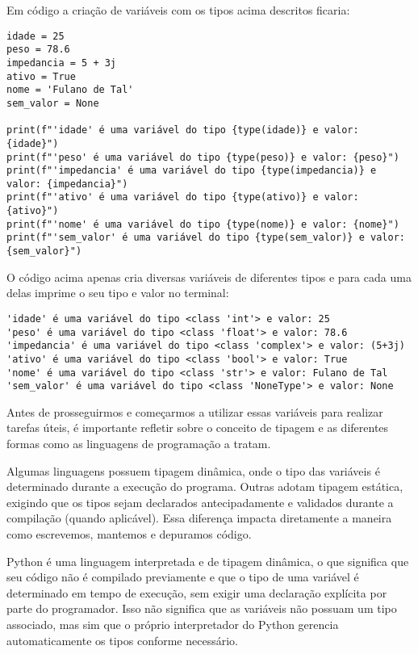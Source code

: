Em código a criação de variáveis com os tipos acima descritos ficaria:
\begin{verbatim}
idade = 25
peso = 78.6
impedancia = 5 + 3j
ativo = True
nome = 'Fulano de Tal'
sem_valor = None

print(f"'idade' é uma variável do tipo {type(idade)} e valor: {idade}")
print(f"'peso' é uma variável do tipo {type(peso)} e valor: {peso}")
print(f"'impedancia' é uma variável do tipo {type(impedancia)} e valor: {impedancia}")
print(f"'ativo' é uma variável do tipo {type(ativo)} e valor: {ativo}")
print(f"'nome' é uma variável do tipo {type(nome)} e valor: {nome}")
print(f"'sem_valor' é uma variável do tipo {type(sem_valor)} e valor: {sem_valor}")
\end{verbatim}

O código acima apenas cria diversas variáveis de diferentes tipos e para cada uma delas imprime o seu tipo e valor no terminal:
\begin{verbatim}
'idade' é uma variável do tipo <class 'int'> e valor: 25
'peso' é uma variável do tipo <class 'float'> e valor: 78.6
'impedancia' é uma variável do tipo <class 'complex'> e valor: (5+3j)
'ativo' é uma variável do tipo <class 'bool'> e valor: True
'nome' é uma variável do tipo <class 'str'> e valor: Fulano de Tal
'sem_valor' é uma variável do tipo <class 'NoneType'> e valor: None
\end{verbatim}

Antes de prosseguirmos e começarmos a utilizar essas variáveis para realizar tarefas úteis, é importante refletir
sobre o conceito de tipagem e as diferentes formas como as linguagens de programação a tratam.

Algumas linguagens possuem tipagem dinâmica, onde o tipo das variáveis é determinado durante a execução do programa.
Outras adotam tipagem estática, exigindo que os tipos sejam declarados antecipadamente e validados durante a compilação
(quando aplicável).
Essa diferença impacta diretamente a maneira como escrevemos, mantemos e depuramos código.

Python é uma linguagem interpretada e de tipagem dinâmica, o que significa que seu código não é compilado previamente
e que o tipo de uma variável é determinado em tempo de execução, sem exigir uma declaração explícita por parte do
programador.
Isso não significa que as variáveis não possuam um tipo associado, mas sim que o próprio interpretador do Python
gerencia automaticamente os tipos conforme necessário.


